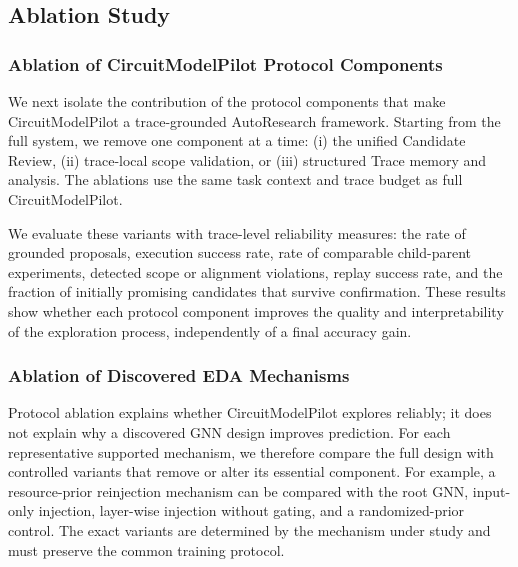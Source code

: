 \subsection{Ablation Study}
\label{sec:ablation}

\subsubsection{Ablation of CircuitModelPilot Protocol Components}
\label{sec:protocol_ablation}

We next isolate the contribution of the protocol components that make CircuitModelPilot a trace-grounded AutoResearch framework. Starting from the full system, we remove one component at a time: (i) the unified Candidate Review, (ii) trace-local scope validation, or (iii) structured Trace memory and analysis. The ablations use the same task context and trace budget as full CircuitModelPilot.

We evaluate these variants with trace-level reliability measures: the rate of grounded proposals, execution success rate, rate of comparable child-parent experiments, detected scope or alignment violations, replay success rate, and the fraction of initially promising candidates that survive confirmation. These results show whether each protocol component improves the quality and interpretability of the exploration process, independently of a final accuracy gain.


\subsubsection{Ablation of Discovered EDA Mechanisms}
\label{sec:mechanism_ablation}

Protocol ablation explains whether CircuitModelPilot explores reliably; it does not explain why a discovered GNN design improves prediction. For each representative supported mechanism, we therefore compare the full design with controlled variants that remove or alter its essential component. For example, a resource-prior reinjection mechanism can be compared with the root GNN, input-only injection, layer-wise injection without gating, and a randomized-prior control. The exact variants are determined by the mechanism under study and must preserve the common training protocol.

